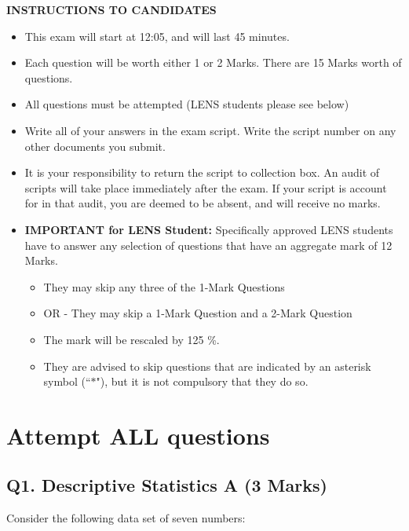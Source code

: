 \documentclass[a4paper,12pt]{article}
\begin{document}
	\begin{center}
		{\bf INSTRUCTIONS TO CANDIDATES}
	\end{center}
	\begin{itemize} 
		\item This exam will start at 12:05, and will last 45 minutes.
		
		\item Each question will be worth either 1 or 2 Marks. There are 15 Marks worth of questions.
		\item All questions must be attempted (LENS students please see below)
		
		\item Write all of your answers in the exam script. Write the script number on any other documents you submit.
		
		\item It is your responsibility to return the script to collection box. An audit of scripts will take place immediately after the exam. If your script is account for in that audit,  you are deemed to be absent, and will receive no marks.
		
		\item \textbf{IMPORTANT for LENS Student:}
		Specifically approved LENS students have to answer any selection of questions that have an aggregate mark of 12 Marks.  
		\begin{itemize}
			\item They may skip any three of the 1-Mark Questions
			\item OR - They may skip a 1-Mark Question and a 2-Mark Question
			\item The mark will be rescaled by 125 \%.
			\item They are advised to skip questions that are indicated by an asterisk symbol (``$\ast$"), but it is not compulsory that they do so.
		\end{itemize}
		
		
	\end{itemize}
	\newpage
\section*{Attempt ALL questions}


\subsection*{Q1. Descriptive Statistics A (3 Marks)} %
Consider the following data set of seven numbers:
\end{document}
